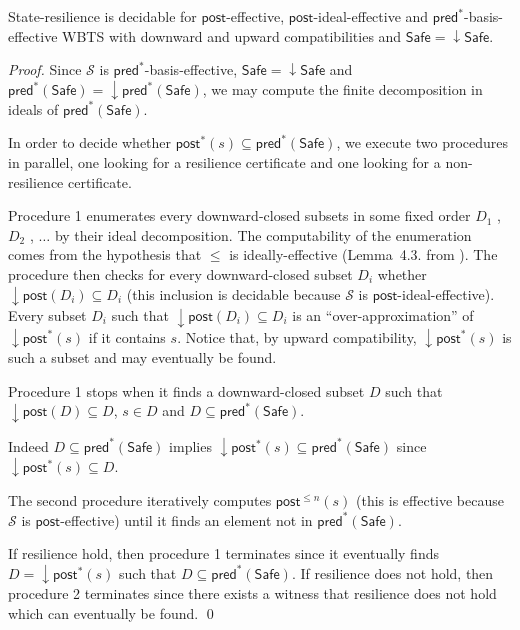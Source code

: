 \documentclass[runningheads]{llncs}
\newcommand{\alain}[1]{\todo[inline,color=red!20]{{\bf AF:} #1}}
\newcommand{\mathieu}[1]{\todo[inline,color=blue!20]{{\bf MH:} #1}}
\newcommand{\pred}{\textsf{pred}}
\newcommand{\post}{\textsf{post}}
\newcommand{\Safe}{\textsf{Safe}}
\begin{document}
\begin{theorem}\label{downward srp}
{\sc State-resilience} is decidable for $\post$-effective, 
$\post$-ideal-effective and $\pred^*$-basis-effective WBTS with downward and upward compatibilities
and $\Safe = \mathop{\downarrow} \Safe$.
\end{theorem}

\begin{proof}
Since $\mathscr{S}$ is $\pred^*$-basis-effective, $\Safe = \mathop{\downarrow} \Safe$ and $\pred^*(\Safe)=\mathop{\downarrow} \pred^*(\Safe)$, we may compute the finite decomposition in ideals of $\pred^*(\Safe)$.

In order to decide whether %
$\post^{ *}(s)  
 \subseteq \pred^*(\Safe)$, we execute two procedures in parallel,
one looking for a resilience certificate and one looking for a non-resilience certificate.

Procedure 1 enumerates every downward-closed subsets in some fixed order $D_1$ , $D_2$ , $\ldots$ by their ideal decomposition. The computability of the enumeration comes from the hypothesis that $\leq$ is ideally-effective (Lemma~4.3. from \cite{DBLP:journals/lmcs/BlondinFM17}).
The procedure then checks for every downward-closed subset $D_i$ whether $\mathop{\downarrow} \post(D_i) \subseteq D_i$ (this inclusion is decidable because $\mathscr{S}$ is $\post$-ideal-effective). 
Every subset $D_i$ such that $\mathop{\downarrow} \post(D_i) \subseteq D_i$ is an “over-approximation” of $\mathop{\downarrow} \post^*(s)$ if it contains $s$.
Notice that, by 
upward compatibility, $\mathop{\downarrow} \post^*(s)$ is such a subset and may eventually be found.

Procedure 1 stops when it finds a downward-closed subset $D$ such that
$\mathop{\downarrow} \post(D) \subseteq D$,
$s \in D$ and
$D   \subseteq \pred^*(\Safe)$. 

Indeed
$D \subseteq  \pred^*(\Safe)$ implies
$\mathop{\downarrow} \post^*(s)  \subseteq  \pred^*(\Safe)$
since $ \mathop{\downarrow} \post^*(s)  \subseteq D$.

The second procedure iteratively computes
$\post^{\leq n}(s) $ (this is effective because $\mathscr{S}$ is $\post$-effective)
until it finds an element
not in $\pred^*(\Safe)$.

If resilience hold, then procedure 1 terminates since it eventually finds
 $D = \mathop{\downarrow} \post^*(s)$ 
 such that  $D \subseteq  \pred^*(\Safe)$.
 If resilience does not hold, then procedure 2 terminates since
there exists a witness that resilience does not hold which can eventually be found. \qed
\end{proof}
\end{document}
